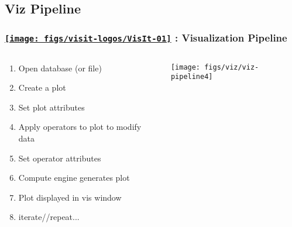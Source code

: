 \subsection{Viz Pipeline}
\begin{frame}
\frametitle{\href{https://wci.llnl.gov/simulation/computer-codes/visit/}{\texttt{[image: figs/visit-logos/VisIt-01]}} \hspace{-.85cm}{\bf \textcolor{lightgray}{VisIt}}: Visualization Pipeline}

\begin{columns}
\begin{column}{5cm}
\begin{beamerboxesrounded}[upper=block head,lower=block body,shadow=true]{}
\begin{enumerate}
        \item Open database (or file)
        \item Create a plot
        \item Set plot attributes
        \item Apply operators to plot to modify data
        \item Set operator attributes
        \item Compute engine generates plot
        \item Plot displayed in vis window
        \item iterate//repeat...
\end{enumerate}
\end{beamerboxesrounded}
\end{column}
\begin{column}{6cm}
        \centering
        \texttt{[image: figs/viz/viz-pipeline4]}
\end{column}
\end{columns}

\end{frame}

